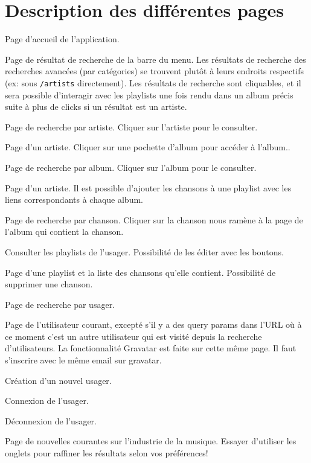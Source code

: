 \documentclass[12pt]{/home/samuel/Documents/GLO/latex/documentClass/GLO_ULAVAL}
\begin{document}
\section*{Description des différentes pages}
\begin{description}[style=nextline]
  \item[\texttt{\slash{}}]\item[] Page d'accueil de l'application.
  \item[\texttt{\slash{}search}] Page de résultat de recherche de la barre du menu. Les résultats de recherche des recherches avancées (par catégories) se trouvent plutôt à leurs endroits respectifs (ex: sous \texttt{\slash{}artists} directement). Les résultats de recherche sont cliquables, et il sera possible d'interagir avec les playlists une fois rendu dans un album précis suite à plus de clicks si un résultat est un artiste.
  \item[\texttt{\slash{}artists}] Page de recherche par artiste. Cliquer sur l'artiste pour le consulter.
  \item[\texttt{\slash{}artists\slash{}:id}] Page d'un artiste. Cliquer sur une pochette d'album pour accéder à l'album..
  \item[\texttt{\slash{}albums}] Page de recherche par album. Cliquer sur l'album pour le consulter.
  \item[\texttt{\slash{}albums\slash{}:id}] Page d'un artiste. Il est possible d'ajouter les chansons à une playlist avec les liens correspondants à chaque album.
  \item[\texttt{\slash{}tracks}] Page de recherche par chanson. Cliquer sur la chanson nous ramène à la page de l'album qui contient la chanson.
  \item[\texttt{\slash{}playlists}] Consulter les playlists de l'usager. Possibilité de les éditer avec les boutons.
  \item[\texttt{\slash{}playlists\slash{}:id}] Page d'une playlist et la liste des chansons qu'elle contient. Possibilité de supprimer une chanson.
  \item[\texttt{\slash{}users}] Page de recherche par usager.
  \item[\texttt{\slash{}account}] Page de l'utilisateur courant, excepté s'il y a des query params dans l'URL où à ce moment c'est un autre utilisateur qui est visité depuis la recherche d'utilisateurs. La fonctionnalité Gravatar est faite sur cette même page. Il faut s'inscrire avec le même email sur gravatar.
  \item[\texttt{\slash{}signup}] Création d'un nouvel usager.  \item[\texttt{\slash{}login}] Connexion de l'usager.  \item[\texttt{\slash{}logout}] Déconnexion de l'usager.
  \item[\texttt{\slash{}news}] Page de nouvelles courantes sur l'industrie de la musique. Essayer d'utiliser les onglets pour raffiner les résultats selon vos préférences!
\end{description}
\end{document}
